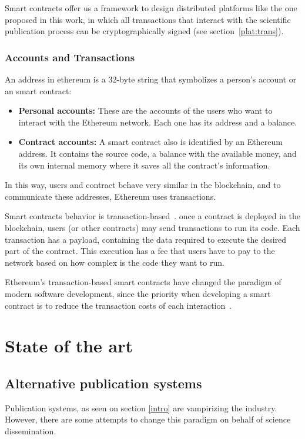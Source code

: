 Smart contracts offer us a framework to design distributed platforms like the
one proposed in this work, in which all transactions that interact with the
scientific publication process can be cryptographically signed (see
section~\ref{plat:trans}).

\subsubsection*{Accounts and Transactions}
An address in ethereum is a 32-byte string that symbolizes a person's account or
an smart contract:
\begin{itemize}
\item \textbf{Personal accounts:} These are the accounts of the users who want
  to interact with the Ethereum network. Each one has its address and a balance.
\item \textbf{Contract accounts:} A smart contract also is identified by an
  Ethereum address. It contains the source code, a balance with the available
  money, and its own internal memory where it saves all the contract's
  information.
\end{itemize}

In this way, users and contract behave very similar in the blockchain, and to
communicate these addresses, Ethereum uses transactions.

Smart contracts behavior is transaction-based~\cite{wood2014ethereum}. once a
contract is deployed in the blockchain, users (or other contracts) may send
transactions to run its code. Each transaction has a payload, containing the
data required to execute the desired part of the contract. This execution has a
fee that users have to pay to the network based on how complex is the code they
want to run.

Ethereum's transaction-based smart contracts have changed the paradigm of modern
software development, since the priority when developing a smart contract is to
reduce the transaction costs of each interaction~\cite{delmolino2016step}.


\section{State of the art}
\subsection{Alternative publication systems}
\label{soa:aps}
Publication systems, as seen on section \ref{intro} are vampirizing the
industry. However, there are some attempts to change this paradigm on behalf of
science dissemination.

